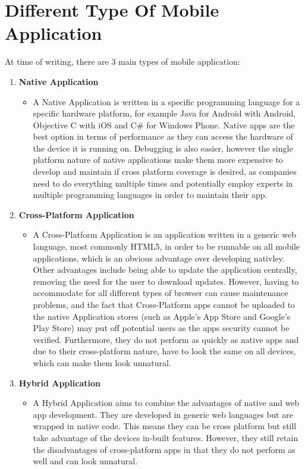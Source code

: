 \documentclass[ %
                    author={Jonathan Rankin},
                supervisor={Dr. David May, Dr. Ian Holyer},
                    degree={MEng},
                     title={CodeTouch},
                  subtitle={A Revolutionary Way To Program Real Code On Touch Screen Devices},
                      type={enterprise},
                      year={2015 } ]{dissertation}
\begin{document}
\section{Different Type Of Mobile Application }\label{sec:ApTypes}
At time of writing, there are 3 main types of mobile application:
\begin{enumerate}
\item \textbf{Native Application}
\begin{itemize}
\item A Native Application is written in a specific programming language for a specific hardware platform, for example Java for Android with Android, Objective C with iOS and C# for Windows Phone. Native apps are the best option in terms of performance as they can access the hardware of the device it is running on. Debugging is also easier, however the single platform nature of native applications make them more expensive to develop and maintain if cross platform coverage is desired, as companies need to do everything multiple times and potentially employ experts in multiple programming languages in order to maintain their app. 
\end{itemize}


\item \textbf{Cross-Platform Application}
\begin{itemize}
\item A Cross-Platform Application is an application written in a generic web language, most commonly HTML5, in order to be runnable on all mobile applications, which is an obvious advantage over developing nativley.  Other advantages include being able to update the application centrally, removing the need for the user to download updates.  However, having to accommodate for all different types of browser can cause maintenance problems, and the fact that Cross-Platform apps cannot be uploaded to the native Application stores (such as Apple's App Store and Google's Play Store) may put off potential users as the apps security cannot be verified. Furthermore, they do not perform as quickly as native apps and due to their cross-platform nature, have to look the same on all devices, which can make them look unnatural. 
\end{itemize}
\item \textbf {Hybrid Application}
\begin{itemize}
\item A Hybrid Application aims to  combine the advantages of native and web app development. They are developed in generic web languages but are wrapped in native code. This means they can be cross platform but still take advantage of the devices in-built features. However, they still retain the disadvantages of cross-platform apps in that they do not perform as well and can look unnatural.
\end{itemize}
\end{enumerate}
\end{document}
